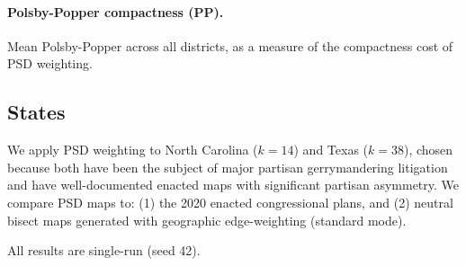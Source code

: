 \paragraph{Polsby-Popper compactness (PP).}
Mean Polsby-Popper across all districts, as a measure of the compactness cost
of PSD weighting.

\subsection{States}

We apply PSD weighting to North Carolina ($k=14$) and Texas ($k=38$), chosen
because both have been the subject of major partisan gerrymandering litigation
and have well-documented enacted maps with significant partisan asymmetry.
We compare PSD maps to: (1) the 2020 enacted congressional plans, and (2)
neutral bisect maps generated with geographic edge-weighting (standard mode).

All results are single-run (seed 42).\singrun
